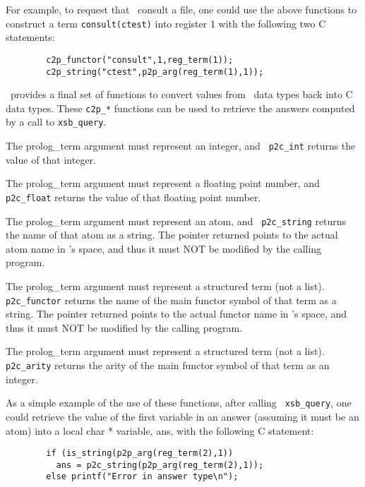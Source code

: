 For example, to request that \ourprolog\ consult a file, one could use
the above functions to construct a term {\tt consult(ctest)} into
register 1 with the following two C statements:
\begin{verbatim}
        c2p_functor("consult",1,reg_term(1));
        c2p_string("ctest",p2p_arg(reg_term(1),1));
\end{verbatim}

\ourprolog\ provides a final set of functions to convert values from
\ourprolog\ data types back into C data types.  These {\tt c2p\_*}
functions can be used to retrieve the answers computed by a call to
{\tt xsb\_query}.

\begin{description}
 
    The prolog\_term argument must represent an integer, and {\tt
    p2c\_int} returns the value of that integer.

 
    The prolog\_term argument must represent a floating point number,
    and {\tt p2c\_float} returns the value of that floating point
    number.

 
    The prolog\_term argument must represent an atom, and {\tt
    p2c\_string} returns the name of that atom as a string. The
    pointer returned points to the actual atom name in \ourprolog 's
    space, and thus it must NOT be modified by the calling program.

 
    The prolog\_term argument must represent a structured term (not a
    list).  {\tt p2c\_functor} returns the name of the main functor
    symbol of that term as a string. The pointer returned points to
    the actual functor name in \ourprolog 's space, and thus it must
    NOT be modified by the calling program.

 
    The prolog\_term argument must represent a structured term (not a
    list).  {\tt p2c\_arity} returns the arity of the main functor
    symbol of that term as an integer.

\end{description}

As a simple example of the use of these functions, after calling {\tt
xsb\_query}, one could retrieve the value of the first variable in an
answer (assuming it must be an atom) into a local char * variable,
ans, with the following C statement:
\begin{verbatim}
        if (is_string(p2p_arg(reg_term(2),1))
          ans = p2c_string(p2p_arg(reg_term(2),1));
        else printf("Error in answer type\n");
\end{verbatim}

